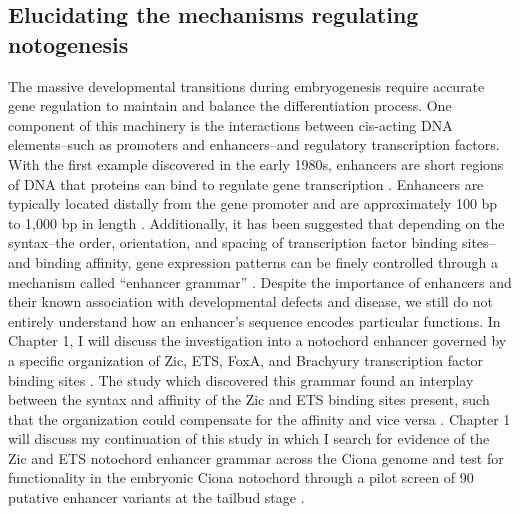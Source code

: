\begin{dissertationintroduction}
    \section{Elucidating the mechanisms regulating notogenesis}
    The massive developmental transitions during embryogenesis require accurate gene regulation to maintain and balance the differentiation process. One component of this machinery is the interactions between cis-acting DNA elements–such as promoters and enhancers–and regulatory transcription factors. With the first example discovered in the early 1980s, enhancers are short regions of DNA that proteins can bind to regulate gene transcription \cite{khoury1983, kvon2021, levine2010}. Enhancers are typically located distally from the gene promoter and are approximately 100 bp to 1,000 bp in length \cite{khoury1983, levine2010}. Additionally, it has been suggested that depending on the syntax–the order, orientation, and spacing of transcription factor binding sites–and binding affinity, gene expression patterns can be finely controlled through a mechanism called “enhancer grammar” \cite{arnone1997, jindal2021}. Despite the importance of enhancers and their known association with developmental defects and disease, we still do not entirely understand how an enhancer’s sequence encodes particular functions. In Chapter 1, I will discuss the investigation into a notochord enhancer governed by a specific organization of Zic, ETS, FoxA, and Brachyury transcription factor binding sites \cite{farley2016, song2022}. The study which discovered this grammar found an interplay between the syntax and affinity of the Zic and ETS binding sites present, such that the organization could compensate for the affinity and vice versa \cite{farley2016}. Chapter 1 will discuss my continuation of this study in which I search for evidence of the Zic and ETS notochord enhancer grammar across the Ciona genome and test for functionality in the embryonic Ciona notochord through a pilot screen of 90 putative enhancer variants at the tailbud stage \cite{song2022}. 

\end{dissertationintroduction}
